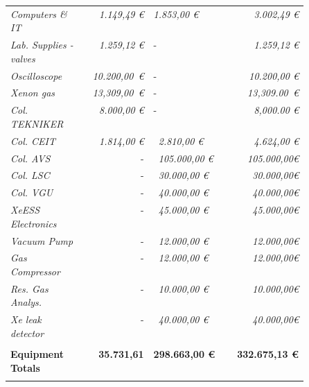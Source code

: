 \documentclass[12pt,a4paper,article]{report} %
\begin{document}
\begin{table}[htp]
\begin{center}
\begin{tabular}{p{0.25\linewidth}   r p{0.25\linewidth} r}
{\footnotesize \emph{Computers \& IT}}&{\footnotesize \emph{1.149,49 \euro{} }}  & {\footnotesize \emph{1.853,00 \euro{} }} &{\footnotesize \emph{3.002,49 \euro{} }}  \\
{\footnotesize \emph{Lab. Supplies - valves}}&{\footnotesize \emph{1.259,12 \euro{} }}  & - &{\footnotesize \emph{1.259,12 \euro{} }}  \\
{\footnotesize \emph{Oscilloscope}}&{\footnotesize \emph{10.200,00 \euro{} }}  & - &{\footnotesize \emph{10.200,00 \euro{} }}  \\ 
{\footnotesize \emph{Xenon gas}}&{\footnotesize \emph{13,309,00 \euro{} }}  & - &{\footnotesize \emph{13,309.00 \euro{} }}  \\ 
{\footnotesize \emph{Col. TEKNIKER}}&{\footnotesize \emph{ 8.000,00 \euro{} }}  & - &{\footnotesize \emph{8,000.00 \euro{} }}  \\ 
{\footnotesize \emph{Col. CEIT}}&{\footnotesize \emph{ 1.814,00 \euro{} }}  & {\footnotesize \emph{ 2.810,00 \euro{} }}  &{\footnotesize \emph{4.624,00 \euro{} }}  \\ 
{\footnotesize \emph{Col. AVS}}&-  &{\footnotesize \emph{ 105.000,00 \euro{} }}&{\footnotesize \emph{105.000,00\euro{} }}  \\ 
{\footnotesize \emph{Col. LSC}}&-  &{\footnotesize \emph{ 30.000,00 \euro{} }}&{\footnotesize \emph{30.000,00\euro{} }}  \\ 
{\footnotesize \emph{Col. VGU}}&-  &{\footnotesize \emph{ 40.000,00 \euro{} }}&{\footnotesize \emph{40.000,00\euro{} }}  \\ 
{\footnotesize \emph{XeESS Electronics}}&-  &{\footnotesize \emph{ 45.000,00 \euro{} }}&{\footnotesize \emph{45.000,00\euro{} }}  \\ 
{\footnotesize \emph{Vacuum Pump}}&-  &{\footnotesize \emph{ 12.000,00 \euro{} }}&{\footnotesize \emph{12.000,00\euro{} }}  \\ 
{\footnotesize \emph{Gas Compressor}}&-  &{\footnotesize \emph{ 12.000,00 \euro{} }}&{\footnotesize \emph{12.000,00\euro{} }}  \\ 
{\footnotesize \emph{Res. Gas Analys.}}&-  &{\footnotesize \emph{ 10.000,00 \euro{} }}&{\footnotesize \emph{10.000,00\euro{} }}  \\ 
{\footnotesize \emph{Xe leak detector}}&-  &{\footnotesize \emph{ 40.000,00 \euro{} }}&{\footnotesize \emph{40.000,00\euro{} }}  \\ \hline \\



\makecell[l] {\textbf{Equipment} \\  \textbf{Totals}}& \textbf{35.731,61}  & \textbf{298.663,00 \euro{}} & \textbf{332.675,13 \euro{}}  \\  \\ \hline \hline 


\end{tabular}
\end{center}
\end{table}
\end{document}
